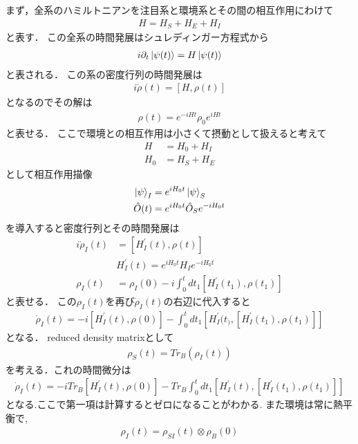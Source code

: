 まず，全系のハミルトニアンを注目系と環境系とその間の相互作用にわけて
\begin{align}
  H= H_S + H_E + H_I
\end{align}
と表す．
この全系の時間発展はシュレディンガー方程式から
\begin{align}
  i \partial_t \ket{\psi (t)} = H \ket{\psi (t)}
\end{align}
と表される．
この系の密度行列の時間発展は
\begin{align}
  i \dot{\rho} (t) = [ H , \rho (t) ]
\end{align}
となるのでその解は
\begin{align}
  \rho (t) = e^{-i H t} \rho_0 e^{i H t}
\end{align}
と表せる．
ここで環境との相互作用は小さくて摂動として扱えると考えて
\begin{align}
  H &= H_0 + H_I \\
  H_0 &= H_S + H_E
\end{align}
として相互作用描像
\begin{align}
  \ket{\psi}_I &= e^{i H_0 t} \ket{\psi}_S \\
  \hat{O}(t) &= e^{i H_0 t} \hat{O}_S e^{-i H_0 t}
\end{align}
を導入すると密度行列とその時間発展は
\begin{align}
  i \dot{\rho}_I (t) &= [ H^{\prime}_I(t) , \rho (t) ]　\\
  & H^{\prime}_I(t) = e^{i H_0 t} H_I e^{-i H_0 t} \\
  \rho_I(t) &= \rho_I(0) - i \int^t_0 dt_1 [ H^{\prime}_I(t_1) , \rho (t_1) ]
\end{align}
と表せる．
この$\rho_I(t)$を再び$\dot{\rho}_I(t)$の右辺に代入すると
\begin{align}
  \dot{\rho}_I (t) = -i [ H^{\prime}_I(t) , \rho (0) ]
  - \int^t_0 dt_1 [ H^{\prime}_I(t_) , [ H^{\prime}_I(t_1) , \rho (t_1) ] ]
\end{align}
となる．
reduced density matrixとして
\begin{align}
  \rho_S(t) = Tr_B ( \rho_I(t) )
\end{align}
を考える．これの時間微分は
\begin{align}
  \dot{\rho}_I (t) = -i Tr_B [ H^{\prime}_I(t) , \rho (0) ]
  - Tr_B \int^t_0 dt_1 [ H^{\prime}_I(t) , [ H^{\prime}_I(t_1) , \rho (t_1) ] ]
\end{align}
となる.ここで第一項は計算するとゼロになることがわかる.
また環境は常に熱平衡で,
\begin{align}
  \rho_I(t) = \rho_{SI} (t) \otimes \rho_B(0)
\end{align}
